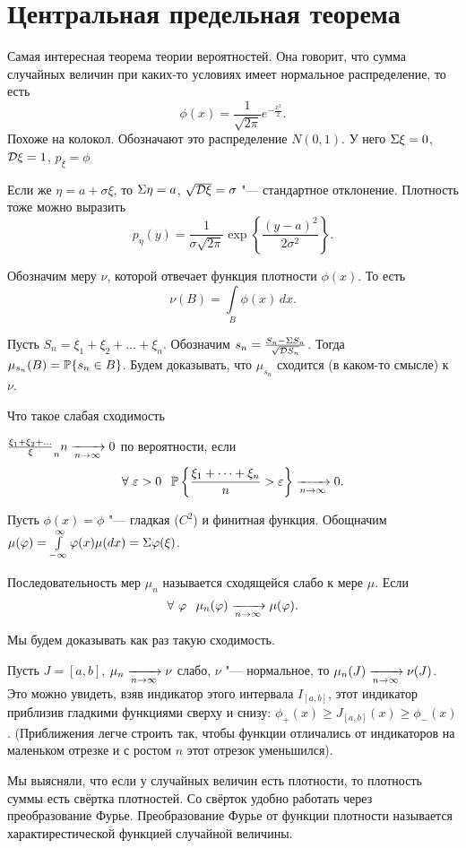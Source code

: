 \section{Центральная предельная теорема}
Самая интересная теорема теории вероятностей. Она говорит, что сумма случайных величин при каких-то условиях имеет нормальное распределение, то есть
\[
  \phi(x) = \frac1{\sqrt{2\pi}} e^{-\frac{x^2}2}.
\]
Похоже на колокол. Обозначают это распределение $N(0,1)$. У него $\E\xi = 0$, $\D\xi = 1$, $p_\xi = \phi$

Если же $\eta = a + \sigma\xi$, то $\E\eta = a$, $\sqrt{\D\xi} = \sigma$ "--- стандартное отклонение. Плотность тоже можно выразить
\[
  p_\eta(y) = \frac1{\sigma\sqrt{2\pi}}\exp\left\{ \frac{(y-a)^2}{2\sigma^2} \right\}.
\]

Обозначим меру $\nu$, которой отвечает функция плотности $\phi(x)$. То есть
\[
  \nu(B) = \int\limits_B \phi(x)\,dx.
\]

Пусть $S_n = \xi_1+\xi_2+\dots + \xi_n$. Обозначим $s_n = \frac{S_n - \E S_n}{\sqrt{\D S_n}}$. Тогда $\mu_{s_n}(B) = \P\{s_n\in B\}$. Будем доказывать, что $\mu_{s_n}$ сходится (в каком-то смысле) к $\nu$.

Что такое слабая сходимость 
\begin{Def}
$\frac{\xi_1 + \xi_2+\dots }\xi_n{n}\te 0$ по вероятности, если
\[
\forall\ \e>0\pau  \P\left\{ \frac{\xi_1+\dots+\xi_n}n>\e \right\} \te 0.
\]
\end{Def}

Пусть $\phi(x) = \phi$ "--- гладкая ($C^2$) и финитная функция. Обощначим $\mu(\phi) = \int\limits_{-\infty}^{\infty} \phi(x)\mu(dx) = \E \phi(\xi)$.
\begin{Def}
Последовательность мер $\mu_n$ называется сходящейся слабо к мере $\mu$. Если
\[
\forall\ \phi\pau \mu_n(\phi) \te \mu(\phi).
\]
\end{Def}

Мы будем доказывать как раз такую сходимость.

Пусть $J=[a,b]$, $\mu_n\te \nu$ слабо, $\nu$ "--- нормальное, то $\mu_n(J)\te \nu(J)$. Это можно увидеть, взяв индикатор этого интервала $I_{[a,b]}$, этот индикатор приблизив гладкими функциями сверху и снизу: $\phi_+(x)\ge J_{[a,b]}(x) \ge \phi_-(x)$. (Приближения легче строить так, чтобы функции отличались от индикаторов на маленьком отрезке и с ростом $n$ этот отрезок уменьшился).

Мы выясняли, что если у случайных величин есть плотности, то плотность суммы есть свёртка плотностей. Со свёрток удобно работать через преобразование Фурье.
Преобразование Фурье от функции плотности называется характирестической функцией случайной величины.


